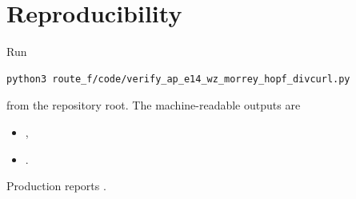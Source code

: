 \documentclass[11pt]{article}
\begin{document}
\section*{Reproducibility}

Run
\begin{verbatim}
python3 route_f/code/verify_ap_e14_wz_morrey_hopf_divcurl.py
\end{verbatim}
from the repository root.  The machine-readable outputs are
\begin{itemize}
 \item {},
 \item {}.
\end{itemize}
Production reports
.



\end{document}
